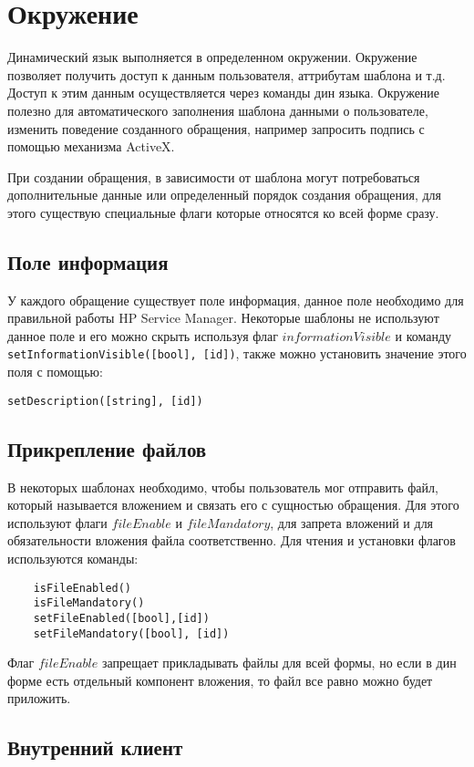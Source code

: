 \documentclass[../index.tex]{subfiles}
\begin{document}
\section{Окружение}  %

Динамический язык выполняется в определенном окружении. Окружение позволяет получить доступ к данным пользователя,
аттрибутам шаблона и т.д. Доступ к этим данным осуществляется через команды дин языка. 
Окружение полезно для автоматического заполнения шаблона данными о пользователе, изменить поведение созданного обращения,
например запросить подпись с помощью механизма ActiveX.

При создании обращения, в зависимости от шаблона могут потребоваться дополнительные данные или определенный порядок 
создания обращения, для этого существую специальные флаги которые относятся ко всей форме сразу.

\subsection{Поле информация}
У каждого обращение существует поле информация, данное поле необходимо для правильной работы HP Service Manager.
Некоторые шаблоны не используют данное поле и его можно скрыть используя флаг $informationVisible$ и команду
\verb|setInformationVisible([bool], [id])|, также можно установить значение этого поля с помощью:
\begin{verbatim}
setDescription([string], [id])
\end{verbatim}

\subsection{Прикрепление файлов}
В некоторых шаблонах необходимо, чтобы пользователь мог отправить файл, который называется вложением и связать его с сущностью обращения.
Для этого используют флаги $fileEnable$ и $fileMandatory$, для запрета вложений и для обязательности вложения файла соответственно.
Для чтения и установки флагов используются команды:
\begin{verbatim}
    isFileEnabled()
    isFileMandatory()
    setFileEnabled([bool],[id])
    setFileMandatory([bool], [id])
\end{verbatim}

Флаг $fileEnable$ запрещает прикладывать файлы для всей формы, но если в дин форме есть отдельный компонент вложения, то
файл все равно можно будет приложить.

\subsection{Внутренний клиент}
\end{document}
